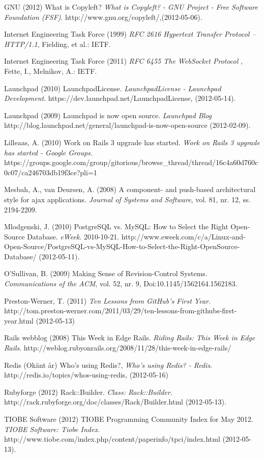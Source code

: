 \begin{flushleft}
GNU (2012) What is Copyleft? \emph{What is Copyleft? - GNU Project - Free Software Foundation (FSF)}. http://www.gnu.org/copyleft/,(2012-05-06).

Internet Engineering Task Force (1999) \emph{RFC 2616 Hypertext Transfer Protocol -- HTTP/1.1}, Fielding, et al.: IETF.

Internet Engineering Task Force (2011) \emph{RFC 6455 The WebSocket Protocol} , Fette, I., Melnikov, A.: IETF.

Launchpad (2010) LaunchpadLicense. \emph{LaunchpadLicense - Launchpad Development}. https://dev.launchpad.net/LaunchpadLicense, (2012-05-14).

Launchpad (2009) Launchpad is now open source. \emph{Launchpad Blog} http://blog.launchpad.net/general/launchpad-is-now-open-source (2012-02-09).

Lilleaas, A. (2010) Work on Rails 3 upgrade has started. \emph{Work on Rails 3 upgrade has started - Google Groups}. https://groups.google.com/group/gitorious/browse\_thread/thread/16c4a60d760c0c07/ca246703db19f3ce?pli=1

Mesbah, A., van Deursen, A. (2008) A component- and push-based architectural style for ajax applications. \emph{Journal of Systems and Software}, vol. 81, nr. 12, ss. 2194-2209.

Mlodgenski, J. (2010) PostgreSQL vs. MySQL: How to Select the Right Open-Source Database. \emph{eWeek}. 2010-10-21.  http://www.eweek.com/c/a/Linux-and-Open-Source/PostgreSQL-vs-MySQL-How-to-Select-the-Right-OpenSource-Database/ (2012-05-11).

O'Sullivan, B. (2009) Making Sense of Revision-Control Systems. \emph{Communications of the ACM}, vol. 52, nr. 9, Doi:10.1145/1562164.1562183.

Preston-Werner, T. (2011) \emph{Ten Lessons from GitHub's First Year}. http://tom.preston-werner.com/2011/03/29/ten-lessons-from-githubs-first-year.html (2012-05-13)

Rails webblog (2008) This Week in Edge Rails. \emph{Riding Rails: This Week in Edge Rails}. http://weblog.rubyonrails.org/2008/11/28/this-week-in-edge-rails/

Redis (Okänt år) Who's using Redis?, \emph{Who's using Redis? - Redis}. http://redis.io/topics/whos-using-redis, (2012-05-16) 

Rubyforge (2012) Rack::Builder. \emph{Class: Rack::Builder}. http://rack.rubyforge.org/doc/classes/Rack/Builder.html (2012-05-13).

TIOBE Software (2012) TIOBE Programming Community Index for May 2012. \emph{TIOBE Software: Tiobe Index}. http://www.tiobe.com/index.php/content/paperinfo/tpci/index.html (2012-05-13).


\end{flushleft}
